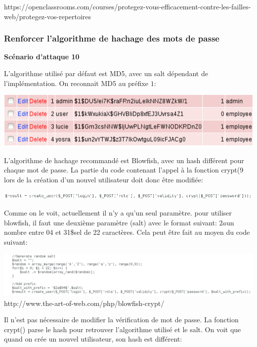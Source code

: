 \documentclass{article}
\begin{document}
https://openclassrooms.com/courses/protegez-vous-efficacement-contre-les-failles-web/protegez-vos-repertoires

\hypertarget{renforcer-lalgorithme-de-hachage-des-mots-de-passe}{%
\subsubsection{Renforcer l'algorithme de hachage des mots de
passe}\label{renforcer-lalgorithme-de-hachage-des-mots-de-passe}}

\textbf{Scénario d'attaque 10}

L'algorithme utilisé par défaut est MD5, avec un salt dépendant de
l'implémentation. On reconnait MD5 au préfixe \(1\):

\includegraphics{images/crypt_avant.PNG}

L'algorithme de hachage recommandé est Blowfish, avec un hash différent
pour chaque mot de passe. La partie du code contenant l'appel à la
fonction crypt(9 lors de la création d'un nouvel utilisateur doit donc
être modifiée:

\includegraphics{images/crypt_avant2.PNG}

Comme on le voit, actuellement il n'y a qu'un seul paramètre. pour
utiliser blowfish, il faut une deuxième paramètre (salt) avec le format
suivant: \(2a\)un nombre entre 04 et 31\$sel de 22 caractères. Cela peut
être fait au moyen du code suivant:

\includegraphics{images/crypt_apres.PNG}
http://www.the-art-of-web.com/php/blowfish-crypt/

Il n'est pas nécessaire de modifier la vérification de mot de passe. La
fonction crypt() parse le hash pour retrouver l'algorithme utilisé et le
salt. On voit que quand on crée un nouvel utilisateur, son hash est
différent:
\end{document}
